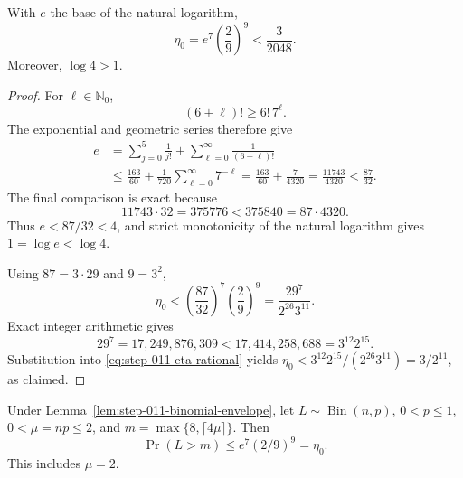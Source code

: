 \begin{lemma}
\label{lem:step-011-numerical-slack}
With \(e\) the base of the natural logarithm,
\begin{equation}\label{eq:step-011-eta-zero}
\eta_0=e^7\left(\frac29\right)^9
<\frac3{2048}.
\end{equation}
Moreover, \(\log4>1\).
\end{lemma}

\begin{proof}
For \(\ell\in\mathbb N_0\),
\begin{equation}\label{eq:step-011-factorial-tail}
(6+\ell)!\ge6!\,7^\ell.
\end{equation}
The exponential and geometric series therefore give
\begin{equation}\label{eq:step-011-e-rational-bound}
\begin{split}
e
&=\sum_{j=0}^5\frac1{j!}
 +\sum_{\ell=0}^\infty\frac1{(6+\ell)!}\\
&\le\frac{163}{60}+\frac1{720}\sum_{\ell=0}^\infty7^{-\ell}
=\frac{163}{60}+\frac7{4320}
=\frac{11743}{4320}<\frac{87}{32}.
\end{split}
\end{equation}
The final comparison is exact because
\begin{equation}\label{eq:step-011-e-cross-product}
11743\cdot32=375776<375840=87\cdot4320.
\end{equation}
Thus \(e<87/32<4\), and strict monotonicity of the natural logarithm gives
\(1=\log e<\log4\).

Using \(87=3\cdot29\) and \(9=3^2\),
\begin{equation}\label{eq:step-011-eta-rational}
\eta_0
<\left(\frac{87}{32}\right)^7\left(\frac29\right)^9
=\frac{29^7}{2^{26}3^{11}}.
\end{equation}
Exact integer arithmetic gives
\begin{equation}\label{eq:step-011-integer-slack}
29^7=17{,}249{,}876{,}309
<17{,}414{,}258{,}688=3^{12}2^{15}.
\end{equation}
Substitution into \eqref{eq:step-011-eta-rational} yields
\(\eta_0<3^{12}2^{15}/(2^{26}3^{11})=3/2^{11}\), as claimed.
\end{proof}

\begin{lemma}
\label{lem:step-011-small-mean}
Under Lemma~\ref{lem:step-011-binomial-envelope}, let
\(L\sim\operatorname{Bin}(n,p)\), \(0<p\le1\),
\(0<\mu=np\le2\), and
\(m=\max\{8,\lceil4\mu\rceil\}\).  Then
\begin{equation}\label{eq:step-011-small-mean-bound}
\Pr(L>m)\le e^7(2/9)^9=\eta_0.
\end{equation}
This includes \(\mu=2\).
\end{lemma}

